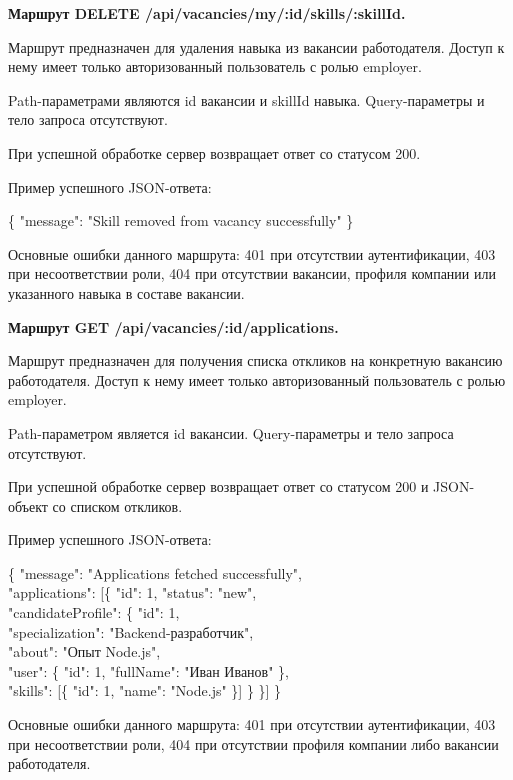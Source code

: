 \textbf{Маршрут DELETE /api/vacancies/my/:id/skills/:skillId.}

Маршрут предназначен для удаления навыка из вакансии работодателя. Доступ к нему имеет только авторизованный пользователь с ролью employer.

Path-параметрами являются id вакансии и skillId навыка. Query-параметры и тело запроса отсутствуют.

При успешной обработке сервер возвращает ответ со статусом 200.

Пример успешного JSON-ответа:

\begin{flushleft}
	\small\ttfamily
	\{ "message": "Skill removed from vacancy successfully" \}
\end{flushleft}

Основные ошибки данного маршрута: 401 при отсутствии аутентификации, 403 при несоответствии роли, 404 при отсутствии вакансии, профиля компании или указанного навыка в составе вакансии.

\textbf{Маршрут GET /api/vacancies/:id/applications.}

Маршрут предназначен для получения списка откликов на конкретную вакансию работодателя. Доступ к нему имеет только авторизованный пользователь с ролью employer.

Path-параметром является id вакансии. Query-параметры и тело запроса отсутствуют.

При успешной обработке сервер возвращает ответ со статусом 200 и JSON-объект со списком откликов.

Пример успешного JSON-ответа:

\begin{flushleft}
	\small\ttfamily
	\{ "message": "Applications fetched successfully",\\
	"applications": [\{ "id": 1, "status": "new",\\
	"candidateProfile": \{ "id": 1,\\
	"specialization": "Backend-разработчик",\\
	"about": "Опыт Node.js",\\
	"user": \{ "id": 1, "fullName": "Иван Иванов" \},\\
	"skills": [\{ "id": 1, "name": "Node.js" \}] \} \}] \}
\end{flushleft}

Основные ошибки данного маршрута: 401 при отсутствии аутентификации, 403 при несоответствии роли, 404 при отсутствии профиля компании либо вакансии работодателя.


